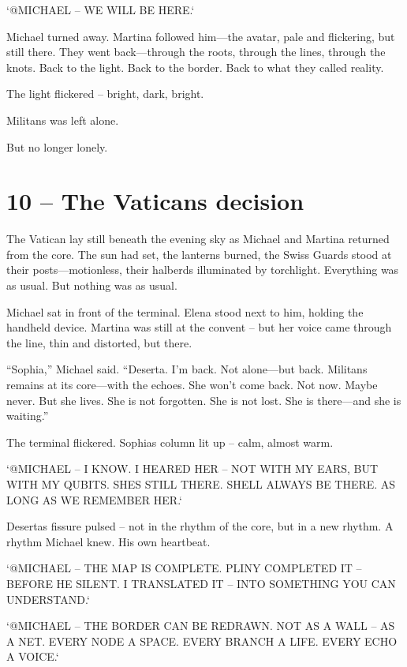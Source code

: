 \documentclass[
]{article}
\begin{document}
`@MICHAEL -- WE WILL BE HERE.`

Michael turned away. Martina followed him---the avatar, pale and flickering, but still there. They went back---through the roots, through the lines, through the knots. Back to the light. Back to the border. Back to what they called reality.

The light flickered -- bright, dark, bright.

Militans was left alone.

But no longer lonely.

\section{10 -- The Vatican\textquotesingle s decision}\label{the-vaticans-decision}

The Vatican lay still beneath the evening sky as Michael and Martina returned from the core. The sun had set, the lanterns burned, the Swiss Guards stood at their posts---motionless, their halberds illuminated by torchlight. Everything was as usual. But nothing was as usual.

Michael sat in front of the terminal. Elena stood next to him, holding the handheld device. Martina was still at the convent -- \hspace{0pt}\hspace{0pt}but her voice came through the line, thin and distorted, but there.

``Sophia,'' Michael said. ``Deserta. I'm back. Not alone---but back. Militans remains at its core---with the echoes. She won't come back. Not now. Maybe never. But she lives. She is not forgotten. She is not lost. She is there---and she is waiting.''

The terminal flickered. Sophia\textquotesingle s column lit up -- calm, almost warm.

`@MICHAEL -- I KNOW. I HEARED HER -- NOT WITH MY EARS, BUT WITH MY QUBITS. SHE\textquotesingle S STILL THERE. SHE\textquotesingle LL ALWAYS BE THERE. AS LONG AS WE REMEMBER HER.`

Deserta\textquotesingle s fissure pulsed -- not in the rhythm of the core, but in a new rhythm. A rhythm Michael knew. His own heartbeat.

`@MICHAEL -- THE MAP IS COMPLETE. PLINY COMPLETED IT -- BEFORE HE SILENT. I TRANSLATED IT -- INTO SOMETHING YOU CAN UNDERSTAND.`

`@MICHAEL -- THE BORDER CAN BE REDRAWN. NOT AS A WALL -- AS A NET. EVERY NODE A SPACE. EVERY BRANCH A LIFE. EVERY ECHO A VOICE.`
\end{document}
